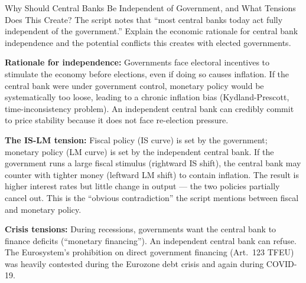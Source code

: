 \documentclass[paper=a5]{scrartcl}
\begin{document}
\begin{question}[type=open]{Why Should Central Banks Be Independent of Government,
  and What Tensions Does This Create?}
The script notes that ``most central banks today act fully independent of
the government.'' Explain the economic rationale for central bank independence
and the potential conflicts this creates with elected governments.

\answerlines[7]

\begin{solution}
  \textbf{Rationale for independence:} Governments face electoral incentives
  to stimulate the economy before elections, even if doing so causes
  inflation. If the central bank were under government control, monetary
  policy would be systematically too loose, leading to a chronic inflation
  bias (Kydland-Prescott, time-inconsistency problem). An independent central
  bank can credibly commit to price stability because it does not face
  re-election pressure.

  \textbf{The IS-LM tension:} Fiscal policy (IS curve) is set by the
  government; monetary policy (LM curve) is set by the independent central
  bank. If the government runs a large fiscal stimulus (rightward IS shift),
  the central bank may counter with tighter money (leftward LM shift) to
  contain inflation. The result is higher interest rates but little change in
  output --- the two policies partially cancel out. This is the
  ``obvious contradiction'' the script mentions between fiscal and monetary
  policy.

  \textbf{Crisis tensions:} During recessions, governments want the central
  bank to finance deficits (``monetary financing''). An independent central
  bank can refuse. The Eurosystem's prohibition on direct government financing
  (Art.\ 123 TFEU) was heavily contested during the Eurozone debt crisis and
  again during COVID-19.
\end{solution}
\end{question}
\end{document}
